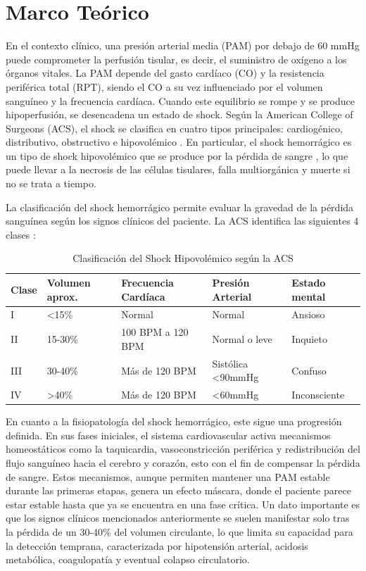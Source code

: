 \documentclass[12pt, letterpaper]{article}
\begin{document}
\section{Marco Teórico}

En el contexto clínico, una presión arterial media (PAM) por debajo de 60 mmHg puede comprometer la perfusión tisular, es decir, el suministro de oxígeno a los órganos vitales. La PAM depende del gasto cardíaco (CO) y la resistencia periférica total (RPT), siendo el CO a su vez influenciado por el volumen sanguíneo y la frecuencia cardíaca. Cuando este equilibrio se rompe y se produce hipoperfusión, se desencadena un estado de shock. Según la American College of Surgeons (ACS), el shock se clasifica en cuatro tipos principales: cardiogénico, distributivo, obstructivo e hipovolémico \cite{hooper2022}. En particular, el shock hemorrágico es un tipo de shock hipovolémico que se produce por la pérdida de sangre \cite{cannon2018}, lo que puede llevar a la necrosis de las células tisulares, falla multiorgánica y muerte si no se trata a tiempo.

La clasificación del shock hemorrágico permite evaluar la gravedad de la pérdida sanguínea según los signos clínicos del paciente. La ACS identifica las siguientes 4 clases \cite{hooper2022}:

\begin{table}[H]
\centering
\caption{Clasificación del Shock Hipovolémico según la ACS}
\label{tab:clasificacion-shock}
\begin{tabular}{|l|l|l|l|l|}
\hline
\textbf{Clase} & \textbf{Volumen aprox.} & \textbf{Frecuencia Cardíaca} & \textbf{Presión Arterial} & \textbf{Estado mental} \\ \hline
I & <15\% & Normal & Normal & Ansioso \\ \hline
II & 15-30\% & 100 BPM a 120 BPM & Normal o leve & Inquieto \\ \hline
III & 30-40\% & Más de 120 BPM & Sistólica <90mmHg & Confuso \\ \hline
IV & >40\% & Más de 120 BPM & <60mmHg & Inconsciente \\ \hline
\end{tabular}
\end{table}

En cuanto a la fisiopatología del shock hemorrágico, este sigue una progresión definida. En sus fases iniciales, el sistema cardiovascular activa mecanismos homeostáticos como la taquicardia, vasoconstricción periférica y redistribución del flujo sanguíneo hacia el cerebro y corazón, esto con el fin de compensar la pérdida de sangre. Estos mecanismos, aunque permiten mantener una PAM estable durante las primeras etapas, genera un efecto máscara, donde el paciente parece estar estable hasta que ya se encuentra en una fase crítica. Un dato importante es que los signos clínicos mencionados anteriormente se suelen manifestar solo tras la pérdida de un 30-40\% del volumen circulante, lo que limita su capacidad para la detección temprana, caracterizada por hipotensión arterial, acidosis metabólica, coagulopatía y eventual colapso circulatorio.
\end{document}
